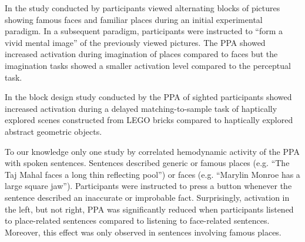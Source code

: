 \documentclass[english]{article}
\begin{document}
In the study conducted by \citep{ocraven2000mental} participants viewed alternating blocks of pictures showing famous faces and familiar places during an initial experimental paradigm.
In a subsequent paradigm, participants were instructed to ``form a vivid mental image'' of the previously viewed pictures.
The PPA showed increased activation during imagination of places compared to faces but the imagination tasks showed a smaller activation level compared to the perceptual task.

In the block design study conducted by \citep{wolbers2011modality} the PPA of sighted participants showed increased activation during a delayed matching-to-sample task of haptically explored scenes constructed from LEGO bricks compared to haptically explored abstract geometric objects.

To our knowledge only one study by \citep{aziz2008modulation} correlated hemodynamic activity of the PPA with spoken sentences.
Sentences described generic or famous places (e.g. ``The Taj Mahal faces a long thin reflecting pool'') or faces  (e.g. ``Marylin Monroe has a large square jaw'').
Participants were instructed to press a button whenever the sentence described an inaccurate or improbable fact.
Surprisingly, activation in the left, but not right, PPA was significantly reduced when participants listened to place-related sentences compared to listening to face-related sentences.
Moreover, this effect was only observed in sentences involving famous places.
\end{document}
